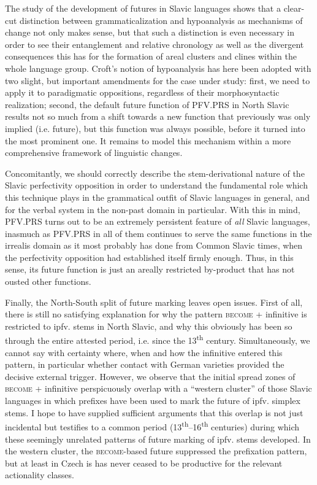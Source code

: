 \documentclass[output=paper,colorlinks,citecolor=brown]{langscibook}
\begin{document}
The study of the development of futures in Slavic languages shows that a clear-cut distinction between grammaticalization and hypoanalysis as mechanisms of change not only makes sense, but that such a distinction is even necessary in order to see their entanglement and relative chronology as well as the divergent consequences this has for the formation of areal clusters and clines within the whole language group. Croft's notion of hypoanalysis has here been adopted with two slight, but important amendments for the case under study: first, we need to apply it to paradigmatic oppositions, regardless of their morphosyntactic realization; second, the default future function of PFV.PRS in North Slavic results not so much from a shift towards a new function that previously was only implied (i.e. future), but this function was always possible, before it turned into the most prominent one. It remains to model this mechanism within a more comprehensive framework of linguistic changes. 

Concomitantly, we should correctly describe the stem\hyp{}derivational nature of the Slavic perfectivity opposition in order to understand the fundamental role which this technique plays in the grammatical outfit of Slavic languages in general, and for the verbal system in the non-past domain in particular. With this in mind, PFV.PRS turns out to be an extremely persistent feature of \textit{all} Slavic languages, inasmuch as PFV.PRS in all of them continues to serve the same functions in the irrealis domain as it most probably has done from Common Slavic times, when the perfectivity opposition had established itself firmly enough. Thus, in this sense, its future function is just an areally restricted by-product that has not ousted other functions.

Finally, the North-South split of future marking leaves open issues. First of all, there is still no satisfying explanation for why the pattern \textsc{become} + infinitive is restricted to ipfv. stems in North Slavic, and why this obviously has been so through the entire attested period, i.e. since the 13\textsuperscript{th} century. Simultaneously, we cannot say with certainty where, when and how the infinitive entered this pattern, in particular whether contact with German varieties provided the decisive external trigger. However, we observe that the initial spread zones of \textsc{become} + infinitive perspicuously overlap with a “western cluster” of those Slavic languages in which prefixes have been used to mark the future of ipfv. simplex stems. I hope to have supplied sufficient arguments that this overlap is not just incidental but testifies to a common period (13\textsuperscript{th}--16\textsuperscript{th} centuries) during which these seemingly unrelated patterns of future marking of ipfv. stems developed. In the western cluster, the \textsc{become}-based future suppressed the prefixation pattern, but at least in Czech is has never ceased to be productive for the relevant actionality classes.
\end{document}
